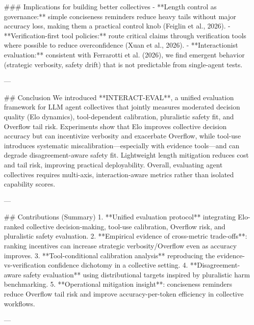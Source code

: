 ### Implications for building better collectives  
- **Length control as governance:** simple conciseness reminders reduce heavy tails without major accuracy loss, making them a practical control knob (Feiglin et al., 2026).  
- **Verification-first tool policies:** route critical claims through verification tools where possible to reduce overconfidence (Xuan et al., 2026).  
- **Interactionist evaluation:** consistent with Ferrarotti et al. (2026), we find emergent behavior (strategic verbosity, safety drift) that is not predictable from single-agent tests.

---

## Conclusion  
We introduced **INTERACT-EVAL**, a unified evaluation framework for LLM agent collectives that jointly measures moderated decision quality (Elo dynamics), tool-dependent calibration, pluralistic safety fit, and Overflow tail risk. Experiments show that Elo improves collective decision accuracy but can incentivize verbosity and exacerbate Overflow, while tool-use introduces systematic miscalibration—especially with evidence tools—and can degrade disagreement-aware safety fit. Lightweight length mitigation reduces cost and tail risk, improving practical deployability. Overall, evaluating agent collectives requires multi-axis, interaction-aware metrics rather than isolated capability scores.

---

## Contributions (Summary)  
1. **Unified evaluation protocol** integrating Elo-ranked collective decision-making, tool-use calibration, Overflow risk, and pluralistic safety evaluation.  
2. **Empirical evidence of cross-metric trade-offs**: ranking incentives can increase strategic verbosity/Overflow even as accuracy improves.  
3. **Tool-conditional calibration analysis** reproducing the evidence-vs-verification confidence dichotomy in a collective setting.  
4. **Disagreement-aware safety evaluation** using distributional targets inspired by pluralistic harm benchmarking.  
5. **Operational mitigation insight**: conciseness reminders reduce Overflow tail risk and improve accuracy-per-token efficiency in collective workflows.

---